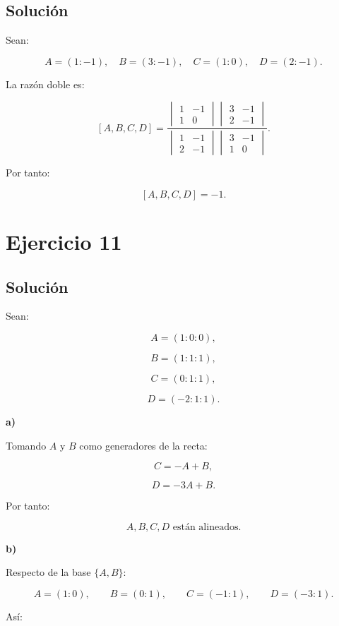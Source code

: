 \documentclass[11pt,a4paper]{article}
\begin{document}
\subsection{Solución}

Sean:

\[
A=(1:-1),
\quad
B=(3:-1),
\quad
C=(1:0),
\quad
D=(2:-1).
\]

La razón doble es:

\[
[A,B,C,D]
=
\frac{
\begin{vmatrix}
1&-1\\
1&0
\end{vmatrix}
\begin{vmatrix}
3&-1\\
2&-1
\end{vmatrix}
}{
\begin{vmatrix}
1&-1\\
2&-1
\end{vmatrix}
\begin{vmatrix}
3&-1\\
1&0
\end{vmatrix}
}.
\]

Por tanto:

\[
\boxed{
[A,B,C,D]=-1.
}
\]

\section{Ejercicio 11}
\subsection{Solución}

Sean:

\[
A=(1:0:0),
\]

\[
B=(1:1:1),
\]

\[
C=(0:1:1),
\]

\[
D=(-2:1:1).
\]

\textbf{a)}

Tomando \(A\) y \(B\) como generadores de la recta:

\[
C=-A+B,
\]

\[
D=-3A+B.
\]

Por tanto:

\[
\boxed{
A,B,C,D\text{ están alineados}.
}
\]

\textbf{b)}

Respecto de la base \(\{A,B\}\):

\[
A=(1:0),
\qquad
B=(0:1),
\qquad
C=(-1:1),
\qquad
D=(-3:1).
\]

Así:
\end{document}
